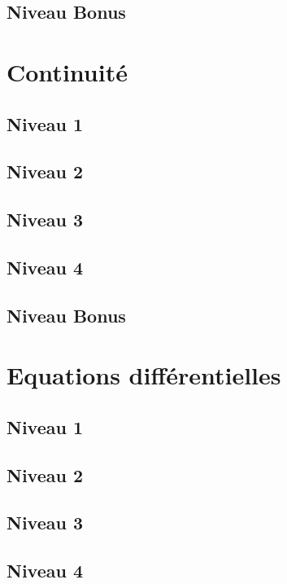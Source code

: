 \documentclass[a4paper]{report}
\begin{document}
			\subsection{Niveau Bonus}
		
		\section{Continuité}
		
			\subsection{Niveau 1}
		
			\subsection{Niveau 2}
		
			\subsection{Niveau 3}
			
			\subsection{Niveau 4}
			
			\subsection{Niveau Bonus}
			
		\section{Equations différentielles}
		
			\subsection{Niveau 1}
		
			\subsection{Niveau 2}
		
			\subsection{Niveau 3}
			
			\subsection{Niveau 4}
			
\end{document}
